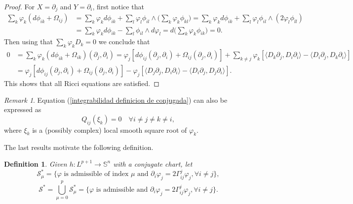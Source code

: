 \documentclass{article}
\newtheorem{defn}[thm]{Definition}
\theoremstyle{remark}
\newtheorem{remark}[thm]{Remark}
\begin{document}
\begin{proof}
    For $X=\partial_j$ and $Y=\partial_i$, first notice that
    \begin{align*}
        \sum_{k}\varphi_k(d\phi_{ik}+\Omega_{ij})&=\sum_k\varphi_kd\phi_{ik}+\sum_l\varphi_l\phi_{il}\wedge\Big(\sum_k\varphi_k\phi_{kl}\Big)=\sum_k\varphi_kd\phi_{ik}+\sum_l\varphi_l\phi_{il}\wedge(2\varphi_l\phi_{ll})\\
        &=\sum_k\varphi_kd\phi_{ik}-\sum_{l}\phi_{il}\wedge d\varphi_l=d\Big(\sum_k\varphi_k\phi_{ik}\Big)=0. 
    \end{align*}
    Then using that $\sum_k\varphi_kD_k=0$ we conclude that
    \begin{align*}
        0&=\sum_{k}\varphi_k(d\phi_{ik}+\Omega_{ik})(\partial_j,\partial_i)=\varphi_j[d\phi_{ij}(\partial_j,\partial_i)+\Omega_{ij}(\partial_j,\partial_i)]+\sum_{k\neq j}\varphi_k[\langle D_k\partial_j,D_i\partial_i\rangle-\langle D_i\partial_j,D_k\partial_i\rangle]\\
        &=\varphi_j[d\phi_{ij}(\partial_j,\partial_i)+\Omega_{ij}(\partial_j,\partial_i)]-\varphi_j[\langle D_j\partial_j,D_i\partial_i\rangle-\langle D_i\partial_j,D_j\partial_i\rangle].
    \end{align*}
    This shows that all Ricci equations are satisfied. 
\end{proof}
\begin{remark}\label{Qij(xik)=0}
    Equation (\ref{integrabilidad definicion de conjugada}) can also be expressed as
    $$Q_{ij}(\xi_k)=0\quad\forall i\neq j\neq k\neq i,$$
    where $\xi_k$ is a (possibly complex) local smooth square root of $\varphi_k$.
\end{remark}
The last results motivate the following definition.
\begin{defn}\label{definicion S y S*}
    \normalfont Given $h:L^{p+1}\rightarrow\mathbb{S}^n$ with a conjugate chart, let
    \begin{equation*}
        \mathcal{S}_\mu^{*}=\{\varphi\text{ is admissible of index }\mu \text{ and } \partial_i\varphi_j=2\Gamma_{ij}^j\varphi_j,\forall i\neq j\},
    \end{equation*}
    \begin{equation*}
        \mathcal{S}^{*}=\bigcup_{\mu=0}^p\mathcal{S}_\mu^{*}=\{\varphi\text{ is admissible and } \partial_i\varphi_j=2\Gamma_{ij}^j\varphi_j,\forall i\neq j\}.
    \end{equation*}    
\end{defn}
\end{document}
